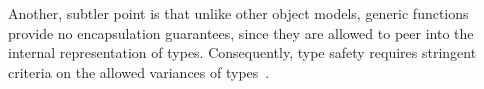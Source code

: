 \documentclass[pldi]{sigplanconf-pldi15}
\begin{document}
Another, subtler point is that unlike other object models, generic functions
provide no encapsulation guarantees, since they are allowed to peer into the
internal representation of types. Consequently, type safety requires stringent
criteria on the allowed variances of types~\cite{Allen2011}.






\end{document}
